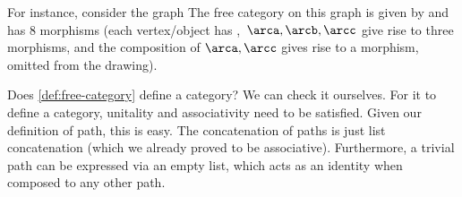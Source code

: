 For instance, consider the graph
%
%
The free category on this graph is given by
%
%
and has 8 morphisms (each vertex/object has ,~$\arca,\arcb,\arcc$ give rise to three morphisms, and the composition of $\arca,\arcc$ gives rise to a morphism, omitted from the drawing).

Does \cref{def:free-category} define a category?
We can check it ourselves.
For it to define a category, unitality and associativity need to be satisfied.
Given our definition of path, this is easy.
The concatenation of paths is just list concatenation (which we already proved to be associative).
Furthermore, a trivial path can be expressed via an empty list, which acts as an identity when composed to any other path.
%
%
